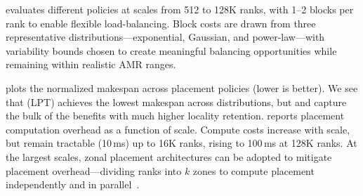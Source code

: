\figAmrMicroScalA
\figAmrMicroScalB

\scalebench{} evaluates different policies at scales from 512 to 128K ranks, with 1--2 blocks per rank to enable flexible load-balancing.
Block costs are drawn from three representative distributions---exponential, Gaussian, and
power-law---with variability bounds chosen to create meaningful balancing opportunities while
remaining within realistic AMR ranges.

 plots the normalized makespan across placement policies (lower is better).
We see that \cple{} (LPT) achieves the lowest makespan across distributions, but \cpla{} and
\cplb{} capture the bulk of the benefits with much higher locality retention.
 reports placement computation overhead as a function of scale.
Compute costs increase with scale, but remain tractable (\mytilde{}10\,ms) up to 16K ranks, rising
to 100\,ms at 128K ranks.
At the largest scales, zonal placement architectures can be adopted to mitigate placement
overhead---dividing ranks into $k$ zones to compute placement independently and in
parallel~\cite{Zheng2011:PeriodicHierarchicalLoad}.


